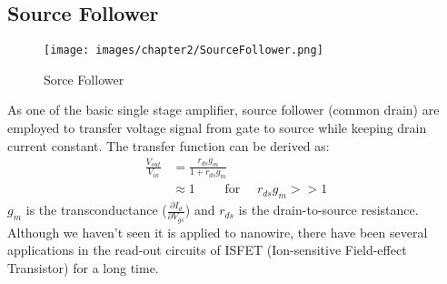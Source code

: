 







\subsection{Source Follower}

\begin{figure}[h]
    \centering
    \texttt{[image: images/chapter2/SourceFollower.png]}
    \fontsize{6}{7}\selectfont
    \caption{Sorce Follower}
    \label{fig:SF}
\end{figure}

As one of the basic single stage amplifier, source follower (common drain) are employed to transfer voltage signal from gate to source while keeping drain current constant.
The transfer function can be derived as:
\setlength{\mathindent}{5.5cm}
\begin{align}
    \frac{V_{out}}{V_{in}} & = \frac{r_{ds}g_m}{1 + r_{ds}g_m} \\    \label{eq:sfTF}
                           & \approx 1 \qquad \text{ for } \quad r_{ds}g_m >> 1
\end{align}
$g_m$ is the transconductance ($\frac{\partial I_d}{\partial V_{gs}}$) and $r_{ds}$ is the drain-to-source resistance.
Although we haven't seen it is applied to nanowire, there have been several applications in the read-out circuits of ISFET (Ion-sensitive Field-effect Transistor)\cite{SF1, SF2} for a long time.



